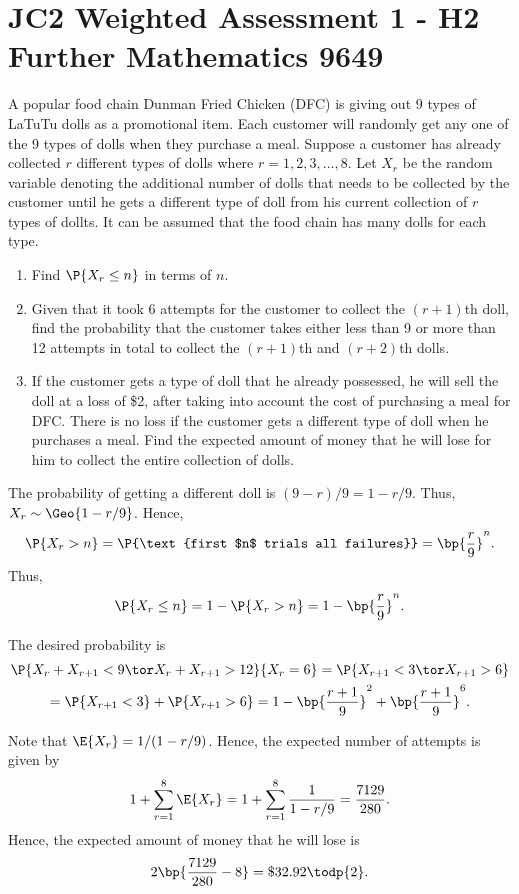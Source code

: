 \section{JC2 Weighted Assessment 1 - H2 Further Mathematics 9649}

\begin{problem}
    A popular food chain Dunman Fried Chicken (DFC) is giving out 9 types of LaTuTu dolls as a promotional item. Each customer will randomly get any one of the 9 types of dolls when they purchase a meal. Suppose a customer has already collected $r$ different types of dolls where $r = 1, 2, 3, \dots, 8$. Let $X_r$ be the random variable denoting the additional number of dolls that needs to be collected by the customer until he gets a different type of doll from his current collection of $r$ types of dollts. It can be assumed that the food chain has many dolls for each type.

    \begin{enumerate}
        \item Find $\P{X_r \leq n}$ in terms of $n$.
        \item Given that it took 6 attempts for the customer to collect the $(r+1)$th doll, find the probability that the customer takes either less than 9 or more than 12 attempts in total to collect the $(r+1)$th and $(r+2)$th dolls.
        \item If the customer gets a type of doll that he already possessed, he will sell the doll at a loss of \$2, after taking into account the cost of purchasing a meal for DFC. There is no loss if the customer gets a different type of doll when he purchases a meal. Find the expected amount of money that he will lose for him to collect the entire collection of dolls.
    \end{enumerate}
\end{problem}
\begin{solution}
    \begin{ppart}
        The probability of getting a different doll is $(9-r)/9 = 1 - r/9$. Thus, $X_r \sim \Geo{1 - r/9}$. Hence, \[\P{X_r > n} = \P{\text{first $n$ trials all failures}} = \bp{\frac{r}9}^n.\] Thus, \[\P{X_r \leq n} = 1 - \P{X_r > n} = 1 - \bp{\frac{r}9}^n.\]
    \end{ppart}
    \begin{ppart}
        The desired probability is
        \begin{gather*}
            \P{X_r + X_{r+1} < 9 \tor X_r + X_{r+1} > 12}{X_r = 6} = \P{X_{r+1} < 3 \tor X_{r+1} > 6}\\
            = \P{X_{r+1} < 3} + \P{X_{r+1} > 6} = 1 - \bp{\frac{r+1}9}^2 + \bp{\frac{r+1}9}^6.
        \end{gather*}
    \end{ppart}
    \begin{ppart}
        Note that $\E{X_r} = 1/(1 - r/9)$. Hence, the expected number of attempts is given by \[1 + \sum_{r = 1}^8 \E{X_r} = 1 + \sum_{r=1}^8 \frac1{1 - r/9} = \frac{7129}{280}.\] Hence, the expected amount of money that he will lose is \[2\bp{\frac{7129}{280} - 8} = \$32.92 \todp{2}.\]
    \end{ppart}
\end{solution}

